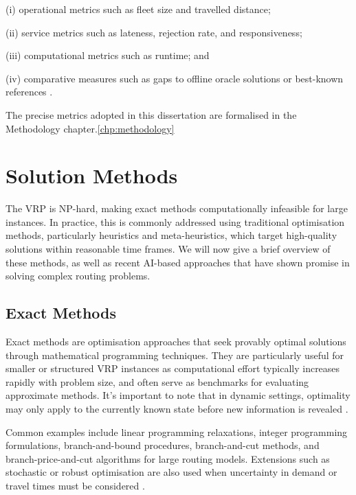 (i) operational metrics such as fleet size and travelled distance;

(ii) service metrics such as lateness, rejection rate, and responsiveness\cite{AntColonySchyns2015};

(iii) computational metrics such as runtime; and

(iv) comparative measures such as gaps to offline oracle solutions or best-known
references \cite{ojedariosRecentDynamicVehicle2021}.

The precise metrics adopted in this dissertation are formalised in the
Methodology chapter.\ref{chp:methodology}
\section{Solution Methods}
The VRP is NP-hard, making exact methods computationally infeasible for large
instances. In practice, this is commonly addressed using traditional
optimisation methods, particularly heuristics and meta-heuristics, which target
high-quality solutions within reasonable time frames. We will now give a brief
overview of these methods, as well as recent AI-based approaches that have shown
promise in solving complex routing problems.

\subsection{Exact Methods}

Exact methods are optimisation approaches that seek provably optimal solutions
through mathematical programming techniques. They are particularly useful for
smaller or structured VRP instances as computational effort typically increases
rapidly with problem size, and often serve as benchmarks for evaluating
approximate methods. It's important to note that in dynamic settings, optimality
may only apply to the currently known state before new information is revealed
\cite{ojedariosRecentDynamicVehicle2021}.

Common examples include linear programming relaxations, integer programming
formulations, branch-and-bound procedures, branch-and-cut methods, and
branch-price-and-cut algorithms for large routing models. Extensions such as
stochastic or robust optimisation are also used when uncertainty in demand or
travel times must be considered \cite{meraliyevComprehensiveSurveyMethods2025}.

